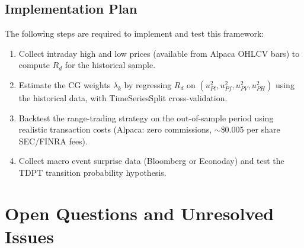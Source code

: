 \documentclass[11pt]{article}
\begin{document}
\subsection{Implementation Plan}

The following steps are required to implement and test this framework:
\begin{enumerate}
    \item Collect intraday high and low prices (available from Alpaca OHLCV bars) to compute $R_d$ for the historical sample.
    \item Estimate the CG weights $\lambda_k$ by regressing $R_d$ on $(u_{Pt}^2, u_{Pf}^2, u_{PV}^2, u_{PH}^2)$ using the historical data, with TimeSeriesSplit cross-validation.
    \item Backtest the range-trading strategy on the out-of-sample period using realistic transaction costs (Alpaca: zero commissions, $\sim$\$0.005 per share SEC/FINRA fees).
    \item Collect macro event surprise data (Bloomberg or Econoday) and test the TDPT transition probability hypothesis.
\end{enumerate}

\section{Open Questions and Unresolved Issues}
\end{document}
